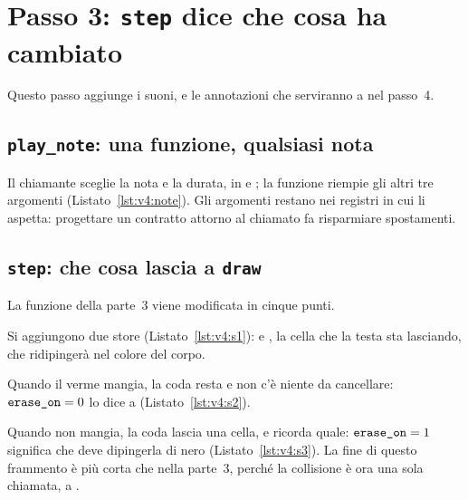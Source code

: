 \section{Passo 3: \texttt{step} dice che cosa ha cambiato}

Questo passo aggiunge i suoni, e le annotazioni che serviranno a 
nel passo~4.

\subsection{\texttt{play\_note}: una funzione, qualsiasi nota}


Il chiamante sceglie la nota e la durata, in  e ; la funzione
riempie gli altri tre argomenti (Listato~\ref{lst:v4:note}). Gli argomenti
restano nei registri in cui  li aspetta: progettare
un contratto attorno al chiamato fa risparmiare spostamenti.

\subsection{\texttt{step}: che cosa lascia a \texttt{draw}}

La funzione  della parte~3 viene modificata in cinque punti.


Si aggiungono due store (Listato~\ref{lst:v4:s1}):  e
, la cella che la testa sta lasciando, che  ridipingerà
nel colore del corpo.


Quando il verme mangia, la coda resta e non c'è niente da cancellare:
$\texttt{erase\_on}=0$ lo dice a  (Listato~\ref{lst:v4:s2}).


Quando non mangia, la coda lascia una cella, e  ricorda quale:
$\texttt{erase\_on}=1$ significa che  deve dipingerla di nero
(Listato~\ref{lst:v4:s3}). La fine di questo frammento è più corta che nella
parte~3, perché la collisione è ora una sola chiamata, a
.

